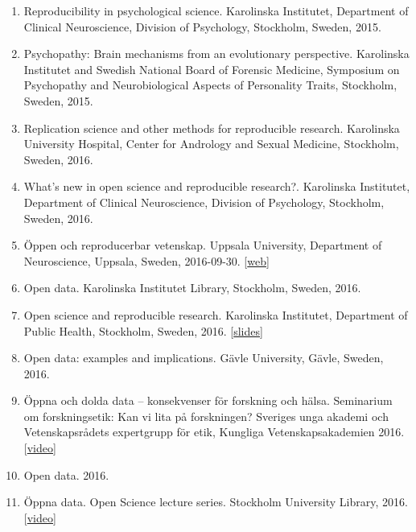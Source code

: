 \documentclass[10pt,a4paper,twocolumn]{article}
\begin{document}
\begin{enumerate}
    \item Reproducibility in psychological science. Karolinska Institutet, Department of Clinical Neuroscience, Division of Psychology, Stockholm, Sweden, 2015.

    \item Psychopathy: Brain mechanisms from an evolutionary perspective. Karolinska Institutet and Swedish National Board of Forensic Medicine, Symposium on Psychopathy and Neurobiological Aspects of Personality Traits, Stockholm, Sweden, 2015.

    \item Replication science and other methods for reproducible research. Karolinska University Hospital, Center for Andrology and Sexual Medicine, Stockholm, Sweden, 2016.

    \item What’s new in open science and reproducible research?. Karolinska Institutet, Department of Clinical Neuroscience, Division of Psychology, Stockholm, Sweden, 2016.

    \item Öppen och reproducerbar vetenskap. Uppsala University, Department of Neuroscience, Uppsala, Sweden, 2016-09-30. [\href{http://www.neuro.uu.se/kalendarium/kalendarium-detaljsida/?eventId=20518}{web}]

    \item Open data. Karolinska Institutet Library, Stockholm, Sweden, 2016.

    \item Open science and reproducible research. Karolinska Institutet, Department of Public Health, Stockholm, Sweden, 2016. [\href{https://osf.io/5a8f2}{slides}]

    \item Open data: examples and implications. Gävle University, Gävle, Sweden, 2016.

    \item Öppna och dolda data – konsekvenser för forskning och hälsa. Seminarium om forskningsetik: Kan vi lita på forskningen? Sveriges unga akademi och Vetenskapsrådets expertgrupp för etik, Kungliga Vetenskapsakademien 2016. [\href{https://www.youtube.com/watch?v=2noejs93mY8}{video}]

    \item Open data. 2016.

    \item Öppna data. Open Science lecture series. Stockholm University Library, 2016. [\href{https://www.youtube.com/watch?v=1azYwpiAunA}{video}]


\end{enumerate}
\end{document}
